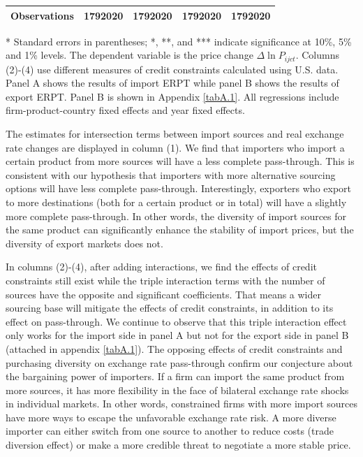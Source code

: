 \documentclass[12pt]{article}
\begin{document}
\begin{table}[htbp]
\begin{threeparttable}
\begin{tabular}{lcccc}
			Observations & 1792020 & 1792020 & 1792020 & 1792020 \\
			\bottomrule
		\end{tabular}
		\begin{tablenotes}
			\footnotesize
			\item[*] Standard errors in parentheses; *, **, and *** indicate significance at 10\%, 5\% and 1\% levels. The dependent variable is the price change $\Delta \ln P_{ijct}$. Columns (2)-(4) use different measures of credit constraints calculated using U.S. data. Panel A shows the results of import ERPT while panel B shows the results of export ERPT. Panel B is shown in Appendix \ref{tabA.1}. All regressions include firm-product-country fixed effects and year fixed effects.
		\end{tablenotes}
	\end{threeparttable}
	\label{tab.source}
\end{table}

The estimates for intersection terms between import sources and real exchange rate changes are displayed in column (1). We find that importers who import a certain product from more sources will have a less complete pass-through. This is consistent with our hypothesis that importers with more alternative sourcing options will have less complete pass-through. Interestingly, exporters who export to more destinations (both for a certain product or in total) will have a slightly more complete pass-through. In other words, the diversity of import sources for the same product can significantly enhance the stability of import prices, but the diversity of export markets does not.

In columns (2)-(4), after adding interactions, we find the effects of credit constraints still exist while the triple interaction terms with the number of sources have the opposite and significant coefficients. That means a wider sourcing base will mitigate the effects of credit constraints, in addition to its effect on pass-through. We continue to observe that this triple interaction effect only works for the import side in panel A but not for the export side in panel B (attached in appendix \ref{tabA.1}). The opposing effects of credit constraints and purchasing diversity on exchange rate pass-through confirm our conjecture about the bargaining power of importers. If a firm can import the same product from more sources, it has more flexibility in the face of bilateral exchange rate shocks in individual markets. In other words, constrained firms with more import sources have more ways to escape the unfavorable exchange rate risk. A more diverse importer can either switch from one source to another to reduce costs (trade diversion effect) or make a more credible threat to negotiate a more stable price. 
\end{document}
